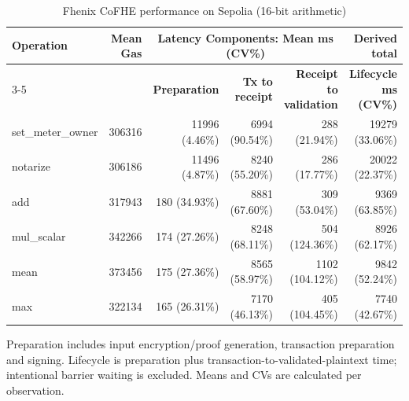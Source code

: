 \begin{table}[!t]
\caption{Fhenix CoFHE performance on Sepolia (16-bit arithmetic)}
\label{tab:fhenix-cofhe-sepolia-benchmark}
\centering
\scriptsize
\setlength{\tabcolsep}{4pt}
\begin{tabular}{|l|r|rrr|r|}
\hline
\textbf{Operation} &
\textbf{Mean Gas} &
\multicolumn{3}{c|}{\textbf{Latency Components: Mean ms (CV\%)}} &
\textbf{Derived total} \\
\cline{3-5}
& &
\textbf{Preparation} &
\textbf{Tx to receipt} &
\textbf{Receipt to validation} &
\textbf{Lifecycle ms (CV\%)} \\
\hline
set\_meter\_owner & 306316 & 11996 (4.46\%) & 6994 (90.54\%) & 288 (21.94\%) & 19279 (33.06\%) \\
notarize & 306186 & 11496 (4.87\%) & 8240 (55.20\%) & 286 (17.77\%) & 20022 (22.37\%) \\
add & 317943 & 180 (34.93\%) & 8881 (67.60\%) & 309 (53.04\%) & 9369 (63.85\%) \\
mul\_scalar & 342266 & 174 (27.26\%) & 8248 (68.11\%) & 504 (124.36\%) & 8926 (62.17\%) \\
mean & 373456 & 175 (27.36\%) & 8565 (58.97\%) & 1102 (104.12\%) & 9842 (52.24\%) \\
max & 322134 & 165 (26.31\%) & 7170 (46.13\%) & 405 (104.45\%) & 7740 (42.67\%) \\
\hline
\end{tabular}
\vspace{2pt}
\parbox{\textwidth}{\scriptsize Preparation includes input encryption/proof generation, transaction preparation and signing. Lifecycle is preparation plus transaction-to-validated-plaintext time; intentional barrier waiting is excluded. Means and CVs are calculated per observation.}
\end{table}
